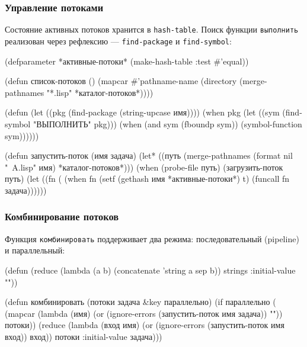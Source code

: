 \documentclass[11pt,a4paper]{article}
\begin{document}
\subsubsection{Управление потоками}

Состояние активных потоков хранится в \texttt{hash-table}. Поиск функции \texttt{выполнить} реализован через рефлексию — \texttt{find-package} и \texttt{find-symbol}:

\begin{lispcode}[caption={мастер/cl/потоки.lisp}]
(defparameter *активные-потоки*
  (make-hash-table :test #'equal))

(defun список-потоков ()
  (mapcar #'pathname-name
    (directory (merge-pathnames "*.lisp" *каталог-потоков*))))

(defun %
  (let ((pkg (find-package (string-upcase имя))))
    (when pkg
      (let ((sym (find-symbol "ВЫПОЛНИТЬ" pkg)))
        (when (and sym (fboundp sym))
          (symbol-function sym))))))

(defun запустить-поток (имя задача)
  (let* ((путь (merge-pathnames (format nil "~A.lisp" имя)
                                *каталог-потоков*)))
    (when (probe-file путь)
      (загрузить-поток путь)
      (let ((fn (%
        (when fn
          (setf (gethash имя *активные-потоки*) t)
          (funcall fn задача))))))
\end{lispcode}

\subsubsection{Комбинирование потоков}

Функция \texttt{комбинировать} поддерживает два режима: последовательный (pipeline) и параллельный:

\begin{lispcode}[caption={мастер/cl/комбо.lisp}]
(defun %
  (reduce (lambda (a b) (concatenate 'string a sep b))
          strings :initial-value ""))

(defun комбинировать (потоки задача &key параллельно)
  (if параллельно
      (%
             (mapcar (lambda (имя)
                       (or (ignore-errors
                             (запустить-поток имя задача))
                           ""))
                     потоки))
      (reduce (lambda (вход имя)
                (or (ignore-errors
                      (запустить-поток имя вход))
                    вход))
              потоки :initial-value задача)))
\end{lispcode}
\end{document}
